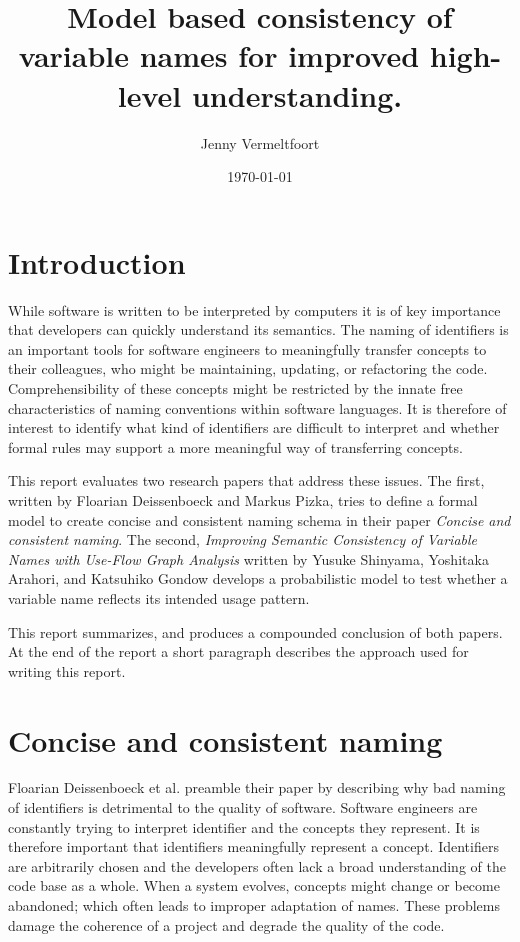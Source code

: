 \documentclass[a4paper,12pt]{article}
\begin{document}
\title{Model based consistency of variable names for improved high-level understanding.}
\author{Jenny Vermeltfoort}
\date{\today}
\maketitle

\sectionfont{\centering\MakeUppercase}
\begin{multicols}{2}
\linenumbers

\section*{Introduction}
While software is written to be interpreted by computers it is of key importance that developers can quickly understand its semantics. The naming of identifiers is an important tools for software engineers to meaningfully transfer concepts to their colleagues, who might be maintaining, updating, or refactoring the code. Comprehensibility of these concepts might be restricted by the innate free characteristics of naming conventions within software languages. It is therefore of interest to identify what kind of identifiers are difficult to interpret and whether formal rules may support a more meaningful way of transferring concepts.

This report evaluates two research papers that address these issues. The first, written by Floarian Deissenboeck and Markus Pizka, tries to define a formal model to create concise and consistent naming schema in their paper \textit{Concise and consistent naming}.\cite{deisenbock_concise_2005} The second, \textit{Improving Semantic Consistency of Variable Names with Use-Flow Graph Analysis} written by Yusuke Shinyama, Yoshitaka Arahori, and Katsuhiko Gondow develops a probabilistic model to test whether a variable name reflects its intended usage pattern.\cite{shinyama_improving_2021}

This report summarizes, and produces a compounded conclusion of both papers. At the end of the report a short paragraph describes the approach used for writing this report.

\newpage

\section*{Concise and consistent naming}
Floarian Deissenboeck et al. preamble their paper by describing why bad naming of identifiers is detrimental to the quality of software. Software engineers are constantly trying to interpret identifier and the concepts they represent.\cite{deisenbock_concise_2005} It is therefore important that identifiers meaningfully represent a concept. Identifiers are arbitrarily chosen and the developers often lack a broad understanding of the code base as a whole. When a system evolves, concepts might change or become abandoned; which often leads to improper adaptation of names. These problems damage the coherence of a project and degrade the quality of the code.


\end{multicols}
\end{document}
